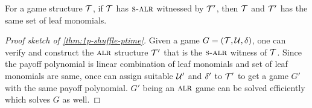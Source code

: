\begin{lemma}
  For a game structure $\mathcal{T}$, if $\mathcal{T}$ has $\textsc{s-alr}$ witnessed by
  $\mathcal{T}'$, then $\mathcal{T}$ and $\mathcal{T}'$ has the same set of leaf monomials.
\end{lemma}

\begin{proof}[Proof sketch of \cref{thm:1p-shuffle-ptime}]
  Given a game $G = (\mathcal{T}, \mathcal{U}, \delta)$, one can verify and construct the
  $\textsc{alr}$ structure $\mathcal{T}'$ that is the $\textsc{s-alr}$ witness of $\mathcal{T}$. Since
  the payoff polynomial is linear combination of leaf monomials and
  set of leaf monomials are same, once can assign suitable $\mathcal{U}'$ and
  $\delta'$ to $\mathcal{T}'$ to get a game $G'$ with the same payoff
  polynomial. $G'$ being an $\textsc{alr}$ game can be solved efficiently
  which solves $G$ as well.
\end{proof}
 


     